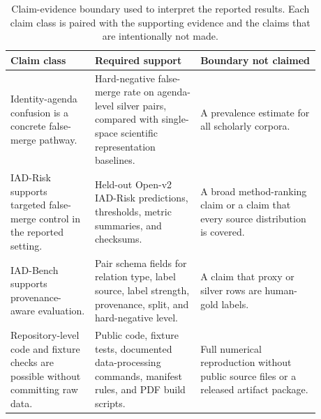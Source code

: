 \documentclass[11pt]{article}
\begin{document}
\begin{table}[H]
\caption{Claim-evidence boundary used to interpret the reported results. Each claim class is paired with the supporting evidence and the claims that are intentionally not made.}
\label{tab:claim-evidence-boundary-main}
\centering
\small
\begin{tabular}{L{0.24\linewidth}L{0.30\linewidth}L{0.34\linewidth}}
\toprule
Claim class & Required support & Boundary not claimed \\
\midrule
Identity-agenda confusion is a concrete false-merge pathway. & Hard-negative false-merge rate on agenda-level silver pairs, compared with single-space scientific representation baselines. & A prevalence estimate for all scholarly corpora. \\
IAD-Risk supports targeted false-merge control in the reported setting. & Held-out Open-v2 IAD-Risk predictions, thresholds, metric summaries, and checksums. & A broad method-ranking claim or a claim that every source distribution is covered. \\
IAD-Bench supports provenance-aware evaluation. & Pair schema fields for relation type, label source, label strength, provenance, split, and hard-negative level. & A claim that proxy or silver rows are human-gold labels. \\
Repository-level code and fixture checks are possible without committing raw data. & Public code, fixture tests, documented data-processing commands, manifest rules, and PDF build scripts. & Full numerical reproduction without public source files or a released artifact package. \\
\bottomrule
\end{tabular}
\end{table}
\end{document}

